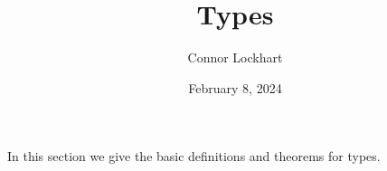 \documentclass[a4paper]{article}
\title{Types}
\date{February 8, 2024}
\author{Connor Lockhart}
\begin{document}
\maketitle
\par{In this section we give the basic definitions and theorems for types.}
\printbibliography
\end{document}
